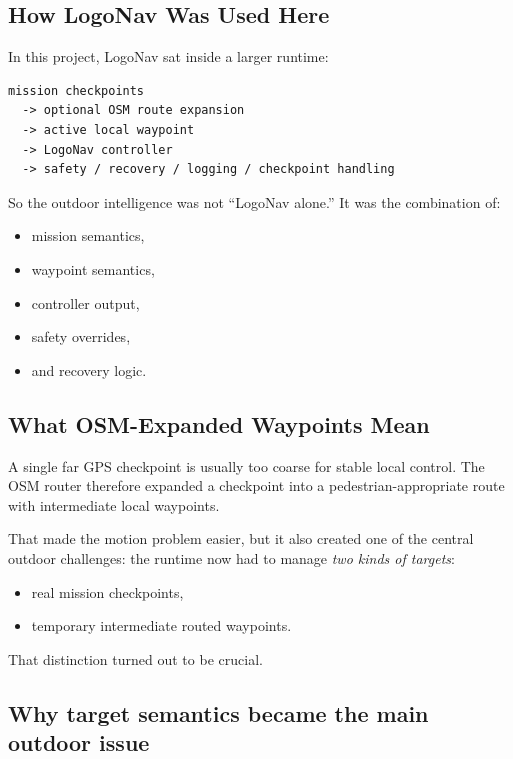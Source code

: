 \documentclass[11pt]{article}
\begin{document}
\subsection{How LogoNav Was Used Here}

In this project, LogoNav sat inside a larger runtime:

\begin{verbatim}
mission checkpoints
  -> optional OSM route expansion
  -> active local waypoint
  -> LogoNav controller
  -> safety / recovery / logging / checkpoint handling
\end{verbatim}

So the outdoor intelligence was not ``LogoNav alone.'' It was the combination of:

\begin{itemize}[nosep]
  \item mission semantics,
  \item waypoint semantics,
  \item controller output,
  \item safety overrides,
  \item and recovery logic.
\end{itemize}

\subsection{What OSM-Expanded Waypoints Mean}

A single far GPS checkpoint is usually too coarse for stable local control. The OSM
router therefore expanded a checkpoint into a pedestrian-appropriate route with
intermediate local waypoints.

That made the motion problem easier, but it also created one of the central outdoor
challenges: the runtime now had to manage \emph{two kinds of targets}:

\begin{itemize}[nosep]
  \item real mission checkpoints,
  \item temporary intermediate routed waypoints.
\end{itemize}

That distinction turned out to be crucial.

\subsection{Why target semantics became the main outdoor issue}
\end{document}
